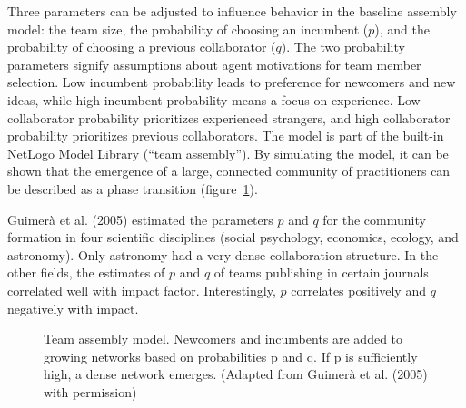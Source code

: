 \documentclass[
  a4paper,
  DIV=11,
  numbers=noendperiod,
  oneside]{scrreprt}
\begin{document}
Three parameters can be adjusted to influence behavior in the baseline
assembly model: the team size, the probability of choosing an incumbent
(\(p\)), and the probability of choosing a previous collaborator
(\(q\)). The two probability parameters signify assumptions about agent
motivations for team member selection. Low incumbent probability leads
to preference for newcomers and new ideas, while high incumbent
probability means a focus on experience. Low collaborator probability
prioritizes experienced strangers, and high collaborator probability
prioritizes previous collaborators. The model is part of the built-in
NetLogo Model Library (``team assembly''). By simulating the model, it
can be shown that the emergence of a large, connected community of
practitioners can be described as a phase transition
(figure~\ref{fig-ch5n-img10-old-48}).

Guimerà et al. (2005) estimated the parameters \(p\) and \(q\) for the
community formation in four scientific disciplines (social psychology,
economics, ecology, and astronomy). Only astronomy had a very dense
collaboration structure. In the other fields, the estimates of \(p\) and
\(q\) of teams publishing in certain journals correlated well with
impact factor. Interestingly, \(p\) correlates positively and \(q\)
negatively with impact.

\begin{figure}


\caption{\label{fig-ch5n-img10-old-48}Team assembly model. Newcomers and
incumbents are added to growing networks based on probabilities p and q.
If p is sufficiently high, a dense network emerges. (Adapted from
Guimerà et al. (2005) with permission)}

\end{figure}%
\end{document}
